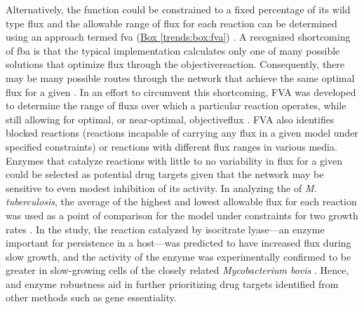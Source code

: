 Alternatively, the  function could be constrained to a fixed 
percentage of its wild type \gls{flux} and the allowable range of \gls{flux} 
for each reaction can be determined using an approach termed 
\gls{fva} (\hyperref[trends:box:fva]{Box \ref{trends:box:fva}}) \cite{Mahadevan:2003di}. A recognized shortcoming 
of \gls{fba} is that the typical implementation calculates only one 
of many possible solutions that optimize \gls{flux} through the 
\gls{objectivereaction}. Consequently, there may be many possible routes through 
the network that achieve the same optimal \gls{flux} for a given 
 \cite{Price:2004hx,Mahadevan:2003di}. 
In an effort to circumvent this shortcoming, 
FVA was developed to determine the range of \glspl{flux} over which 
a particular reaction operates, while still allowing for 
optimal, or near-optimal, \gls{objectiveflux} \cite{Mahadevan:2003di}. FVA also identifies 
blocked reactions (reactions incapable of carrying any \gls{flux} in 
a given model under specified constraints) or reactions with 
different \gls{flux} ranges in various media. Enzymes that catalyze 
reactions with little to no variability in \gls{flux} for a given 
 could be selected as potential drug targets given that 
the network may be sensitive to even modest inhibition of its 
activity. In analyzing the  of \textit{M. tuberculosis}, the 
average of the highest and lowest allowable \gls{flux} for each reaction 
was used as a point of comparison for the model under constraints 
for two growth rates \cite{Beste:2007bi}. In the study, the reaction catalyzed by 
isocitrate lyase---an enzyme important for persistence in a 
host---was predicted to have increased \gls{flux} during slow growth, 
and the activity of the enzyme was experimentally confirmed to 
be greater in slow-growing cells of the closely related 
\textit{Mycobacterium bovis} \cite{Beste:2007bi}. Hence,  and enzyme 
robustness aid in further prioritizing drug targets identified 
from other methods such as gene essentiality.

